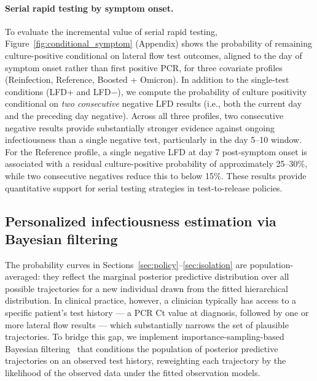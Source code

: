 \documentclass[12pt]{article}
\begin{document}
\paragraph{Serial rapid testing by symptom onset.} To evaluate the incremental value of serial rapid testing, Figure~\ref{fig:conditional_symptom} (Appendix) shows the probability of remaining culture-positive conditional on lateral flow test outcomes, aligned to the day of symptom onset rather than first positive PCR, for three covariate profiles (Reinfection, Reference, Boosted + Omicron). In addition to the single-test conditions (LFD$+$ and LFD$-$), we compute the probability of culture positivity conditional on \emph{two consecutive} negative LFD results (i.e., both the current day and the preceding day negative). Across all three profiles, two consecutive negative results provide substantially stronger evidence against ongoing infectiousness than a single negative test, particularly in the day 5--10 window. For the Reference profile, a single negative LFD at day 7 post-symptom onset is associated with a residual culture-positive probability of approximately 25--30\%, while two consecutive negatives reduce this to below 15\%. These results provide quantitative support for serial testing strategies in test-to-release policies.

\subsection{Personalized infectiousness estimation via Bayesian filtering} \label{sec:filtering}

The probability curves in Sections~\ref{sec:policy}--\ref{sec:isolation} are population-averaged: they reflect the marginal posterior predictive distribution over all possible trajectories for a new individual drawn from the fitted hierarchical distribution. In clinical practice, however, a clinician typically has access to a specific patient's test history --- a PCR Ct value at diagnosis, followed by one or more lateral flow results --- which substantially narrows the set of plausible trajectories. To bridge this gap, we implement importance-sampling-based Bayesian filtering~\cite{gelman2013bayesian} that conditions the population of posterior predictive trajectories on an observed test history, reweighting each trajectory by the likelihood of the observed data under the fitted observation models.
\end{document}

